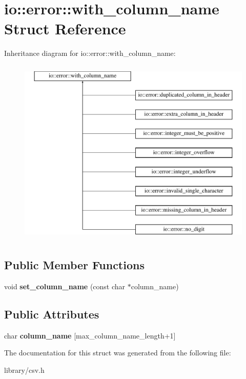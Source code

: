 \hypertarget{structio_1_1error_1_1with__column__name}{}\section{io\+:\+:error\+:\+:with\+\_\+column\+\_\+name Struct Reference}
\label{structio_1_1error_1_1with__column__name}
Inheritance diagram for io\+:\+:error\+:\+:with\+\_\+column\+\_\+name\+:\begin{figure}[H]
\begin{center}
\leavevmode
\includegraphics[height=9.000000cm]{structio_1_1error_1_1with__column__name}
\end{center}
\end{figure}
\subsection*{Public Member Functions}
\begin{DoxyCompactItemize}
\item 
\mbox{\label{structio_1_1error_1_1with__column__name_a2a8144d3591a4bb618368ca7261befef}} 
void {\bfseries set\+\_\+column\+\_\+name} (const char $\ast$column\+\_\+name)
\end{DoxyCompactItemize}
\subsection*{Public Attributes}
\begin{DoxyCompactItemize}
\item 
\mbox{\label{structio_1_1error_1_1with__column__name_af40ba00f1f035d363b099baf1f724323}} 
char {\bfseries column\+\_\+name} \mbox{[}max\+\_\+column\+\_\+name\+\_\+length+1\mbox{]}
\end{DoxyCompactItemize}


The documentation for this struct was generated from the following file\+:\begin{DoxyCompactItemize}
\item 
library/csv.\+h\end{DoxyCompactItemize}
